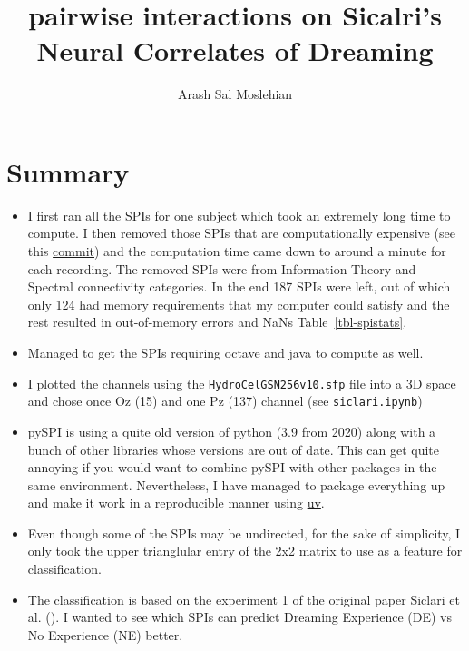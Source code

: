 \documentclass[
  man,
  longtable,
  nolmodern,
  notxfonts,
  notimes,
  colorlinks=true,linkcolor=blue,citecolor=blue,urlcolor=blue]{apa7}
\title{pairwise interactions on Sicalri's Neural Correlates of Dreaming}
\author{Arash Sal Moslehian}
\affiliation{
{Neuro-X, EPFL}}
\begin{document}
\maketitle


\setcounter{secnumdepth}{-\maxdimen} %

\setlength\LTleft{0pt}


\section{Summary}\label{summary}

\begin{itemize}
\item
  I first ran all the SPIs for one subject which took an extremely long
  time to compute. I then removed those SPIs that are computationally
  expensive (see this
  \href{https://github.com/arashsm79/eeg-pairwise-analysis/commit/5046f4e75f1b09937b2b5c9ab8b28e35a6c43362}{commit})
  and the computation time came down to around a minute for each
  recording. The removed SPIs were from Information Theory and Spectral
  connectivity categories. In the end 187 SPIs were left, out of which
  only 124 had memory requirements that my computer could satisfy and
  the rest resulted in out-of-memory errors and NaNs
  Table~\ref{tbl-spistats}.
\item
  Managed to get the SPIs requiring octave and java to compute as well.
\item
  I plotted the channels using the \texttt{HydroCelGSN256v10.sfp} file
  into a 3D space and chose once Oz (15) and one Pz (137) channel (see
  \texttt{siclari.ipynb})
\item
  pySPI is using a quite old version of python (3.9 from 2020) along
  with a bunch of other libraries whose versions are out of date. This
  can get quite annoying if you would want to combine pySPI with other
  packages in the same environment. Nevertheless, I have managed to
  package everything up and make it work in a reproducible manner using
  \href{https://docs.astral.sh/uv/}{uv}.
\item
  Even though some of the SPIs may be undirected, for the sake of
  simplicity, I only took the upper trianglular entry of the 2x2 matrix
  to use as a feature for classification.
\item
  The classification is based on the experiment 1 of the original paper
  Siclari et al.
  (). I wanted
  to see which SPIs can predict Dreaming Experience (DE) vs No
  Experience (NE) better.
\end{itemize}
\end{document}
